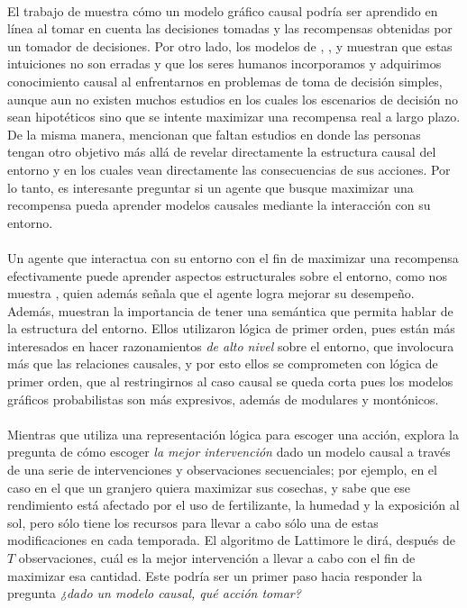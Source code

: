 \documentclass[11pt]{article}
\theoremstyle{plain}
\begin{document}
\\
El trabajo de \cite{wellen2012learning} muestra cómo un modelo gráfico causal podría ser aprendido en línea al tomar en cuenta las decisiones tomadas y las recompensas obtenidas por un tomador de decisiones. Por otro lado, los modelos de \cite{sloman2006causal}, \cite{meder2008inferring}, \cite{hagmayer2009decision} y \cite{hagmayer2013repeated} muestran que estas intuiciones no son erradas y que los seres humanos incorporamos y adquirimos conocimiento causal al enfrentarnos en problemas de toma de decisión simples, aunque aun no existen muchos estudios en los cuales los escenarios de decisión no sean hipotéticos sino que se intente maximizar una recompensa real a largo plazo. De la misma manera, \cite{hagmayer2013repeated} mencionan que faltan estudios en donde las personas tengan otro objetivo más allá de revelar directamente la estructura causal del entorno y en los cuales vean directamente las consecuencias de sus acciones. Por lo tanto, es interesante preguntar si un agente que busque maximizar una recompensa pueda aprender modelos causales mediante la interacción con su entorno.\\
\\
Un agente que interactua con su entorno con el fin de maximizar una recompensa efectivamente puede aprender aspectos estructurales sobre el entorno, como nos muestra \cite{garnelo2016towards}, quien además señala que el agente logra mejorar su desempeño. Además, muestran la importancia de tener una semántica que permita hablar de la estructura del entorno. Ellos utilizaron lógica de primer orden, pues están más interesados en hacer razonamientos \textit{de alto nivel} sobre el entorno, que involocura más que las relaciones causales, y por esto ellos se comprometen con lógica de primer orden, que al restringirnos al caso causal se queda corta pues los modelos gráficos probabilistas son más expresivos, además de modulares y montónicos.\\
\\
Mientras que \cite{garnelo2016towards} utiliza una representación lógica para escoger una acción, \cite{lattimoreNIPS2016} explora la pregunta de cómo escoger \textit{la mejor intervención} dado un modelo causal a través de una serie de intervenciones y observaciones secuenciales; por ejemplo, en el caso en el que un granjero quiera maximizar sus cosechas, y sabe que ese rendimiento está afectado por el uso de fertilizante, la humedad y la exposición al sol, pero sólo tiene los recursos para llevar a cabo sólo una de estas modificaciones en cada temporada. El algoritmo de Lattimore le dirá, después de $T$ observaciones, cuál es la mejor intervención a llevar a cabo con el fin de maximizar esa cantidad. Este podría ser un primer paso hacia responder la pregunta \textit{¿dado un modelo causal, qué acción tomar?}\\
\end{document}
